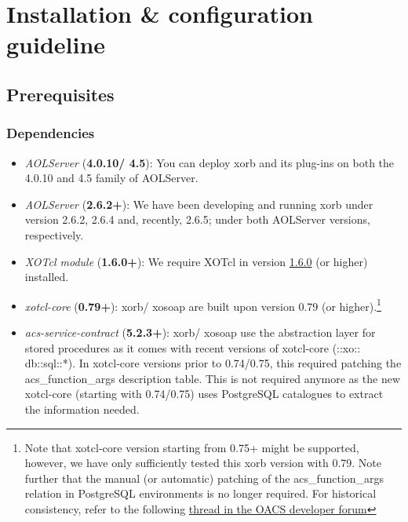      \section{Installation \& configuration guideline}\label{sec:installation}
     	\subsection{Prerequisites}
	\subsubsection{Dependencies}
	\begin{itemize}
	\item \emph{AOLServer} (\textbf{4.0.10/ 4.5}): You can deploy
          xorb and its plug-ins on both the 4.0.10 and 4.5 family of AOLServer.
	\item \emph{AOLServer} (\textbf{2.6.2+}): We have been
          developing and running xorb under version 2.6.2, 2.6.4 and, recently,
          2.6.5; under both AOLServer versions, respectively.
	\item \emph{XOTcl module} (\textbf{1.6.0+}): We require XOTcl
          in version
          \href{http://media.wu-wien.ac.at/download/xotcl-1.6.0.tar.gz}{1.6.0}
          (or higher) installed.
	\item \emph{xotcl-core} (\textbf{0.79+}): xorb/ xosoap are
          built upon version 0.79 (or higher).\footnote{
            Note that xotcl-core version starting from 0.75+ might be
            supported, however, we have only sufficiently tested this
            xorb version with 0.79. Note further that the manual (or
            automatic) patching of the acs\_function\_args relation in
            PostgreSQL environments is no longer required. For
            historical consistency, refer to the following
            \href{http://openacs.org/forums/message-view?message_id=1165990}{thread
              in the OACS developer forum}
          }
	\item \emph{acs-service-contract} (\textbf{5.2.3+}): xorb/
          xosoap use the abstraction layer for stored procedures as it comes
          with recent versions of xotcl-core (::xo:: db::sql::*). In
          xotcl-core versions prior to 0.74/0.75, this required
          patching the acs\_function\_args description table. This is
          not required anymore as the new xotcl-core (starting with
          0.74/0.75) uses PostgreSQL catalogues to extract the
          information needed.
	\end{itemize}
